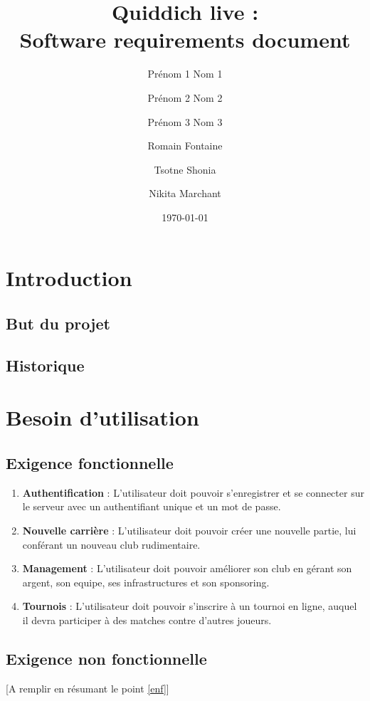 \documentclass[a4paper]{article}
\title{Quiddich live : \\Software requirements document}
\author{Prénom 1 Nom 1 \and Prénom 2 Nom 2 \and Prénom 3 Nom 3 \and
Romain Fontaine \and Tsotne Shonia \and Nikita Marchant}
\date{\today}
\begin{document}
\maketitle

\section{Introduction}
\subsection{But du projet}
\printglossary[numberedsection]
\subsection{Historique}
\section{Besoin d'utilisation}
\subsection{Exigence fonctionnelle}
\begin{enumerate}
\item \textbf{Authentification} : L'utilisateur doit pouvoir s'enregistrer et se connecter sur le serveur avec un authentifiant unique et un mot de passe.
\item \textbf{Nouvelle carrière} : L'utilisateur doit pouvoir créer une nouvelle partie, lui conférant un nouveau \gls{club} rudimentaire.
\item \textbf{Management} : L'utilisateur doit pouvoir améliorer son \gls{club} en gérant son argent, son \gls{equipe}, ses infrastructures et son sponsoring.
\item \textbf{Tournois} : L'utilisateur doit pouvoir s'inscrire à un tournoi en ligne, auquel il devra participer à des matches contre d'autres joueurs.
\end{enumerate}
\subsection{Exigence non fonctionnelle}
[A remplir en résumant le point \ref{enf}]
\end{document}
